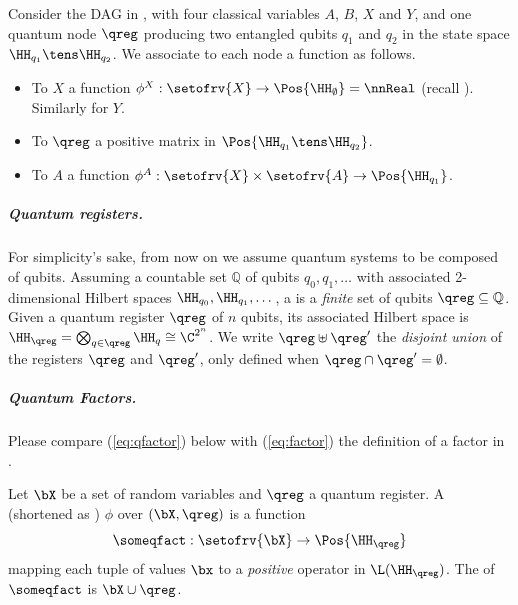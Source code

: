 \begin{example}
Consider the DAG in , with four classical variables $A$, $B$, $X$ and $Y$, and one quantum node $\qreg$ producing two entangled qubits $q_1$ and $q_2$ in the state space $\HH_{q_1}\tens\HH_{q_2}$.
We associate to each node a function as follows.
\begin{itemize}
\item
To $X$ a function $\phi^X: \setofrv{X}\to\Pos{\HH_{\emptyset}}=\nnReal$ (recall ).
Similarly for $Y$.
\item
To $\qreg$ a positive matrix in $\Pos{\HH_{q_1}\tens\HH_{q_2}}$.
\item
To $A$ a function $\phi^A:\setofrv{X}\times\setofrv{A} \to \Pos{\HH_{q_1}}$.
\end{itemize}
\end{example}


\subparagraph*{Quantum registers.}

For simplicity's sake, from now on we assume quantum systems to be composed of qubits.
Assuming a countable set $\mathbb{Q}$ of qubits $q_0,q_1,\dots$ with associated 2-dimensional Hilbert spaces $\HH_{q_0},\HH_{q_1},\dots$, a  is a \emph{finite} set of qubits $\qreg \subseteq \mathbb{Q}$.
Given a quantum register $\qreg$ of $n$ qubits, its associated Hilbert space is $\HH_{\qreg} = \bigotimes_{q \in \qreg} \HH_{q} \cong \C^{2^n}$.
We write $\qreg \uplus \qreg'$ the \emph{disjoint union} of the registers $\qreg$ and $\qreg'$, only defined when $\qreg \cap \qreg' = \emptyset$.

\subparagraph*{Quantum Factors.}

Please compare (\ref{eq:qfactor}) below with (\ref{eq:factor}) the definition of a factor in .

\begin{definition}
Let $\bX$ be a set of random variables and $\qreg$ a quantum register.
A  (shortened as ) $\phi$ over $(\bX,\qreg)$ is a function
\begin{equation}\label{eq:qfactor}
\someqfact: \setofrv{\bX} \to \Pos{\HH_\qreg}
\end{equation}
mapping each tuple of values $\bx$ to a \emph{positive} operator in $\L(\HH_\qreg)$.
The  of $\someqfact$ is $\bX\cup\qreg$.
\end{definition}

